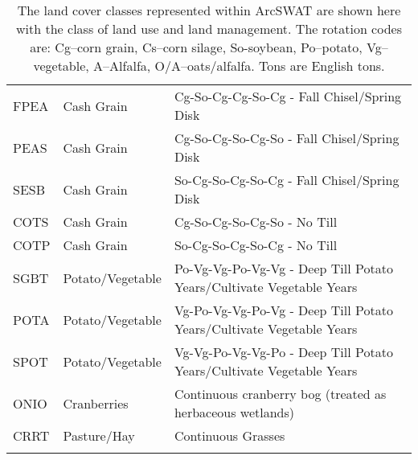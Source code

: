 \begin{longtable}{lll}
  FPEA & Cash Grain & Cg-So-Cg-Cg-So-Cg - Fall Chisel/Spring Disk \\ 
  PEAS & Cash Grain & Cg-So-Cg-So-Cg-So - Fall Chisel/Spring Disk \\ 
  SESB & Cash Grain & So-Cg-So-Cg-So-Cg - Fall Chisel/Spring Disk \\ 
  COTS & Cash Grain & Cg-So-Cg-So-Cg-So - No Till \\ 
  COTP & Cash Grain & So-Cg-So-Cg-So-Cg - No Till \\ 
  SGBT & Potato/Vegetable & Po-Vg-Vg-Po-Vg-Vg - Deep Till Potato Years/Cultivate Vegetable Years \\ 
  POTA & Potato/Vegetable & Vg-Po-Vg-Vg-Po-Vg - Deep Till Potato Years/Cultivate Vegetable Years \\ 
  SPOT & Potato/Vegetable & Vg-Vg-Po-Vg-Vg-Po - Deep Till Potato Years/Cultivate Vegetable Years \\
  ONIO & Cranberries      & Continuous cranberry bog (treated as herbaceous wetlands) \\
  CRRT & Pasture/Hay & Continuous Grasses \\ 
   \hline
\hline
\caption{The land cover classes represented within ArcSWAT are shown here with the class of land use and land management. The rotation codes are: Cg--corn grain, Cs--corn silage, So-soybean, Po--potato, Vg--vegetable, A--Alfalfa, O/A--oats/alfalfa. Tons are English tons.} 
\label{tab:lnd_mgt_def}
\end{longtable}
